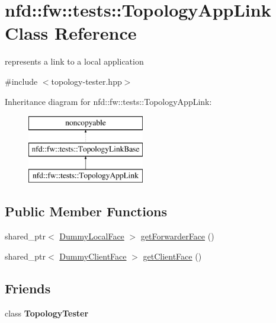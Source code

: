 \hypertarget{classnfd_1_1fw_1_1tests_1_1TopologyAppLink}{}\section{nfd\+:\+:fw\+:\+:tests\+:\+:Topology\+App\+Link Class Reference}
\label{classnfd_1_1fw_1_1tests_1_1TopologyAppLink}


represents a link to a local application  




{\ttfamily \#include $<$topology-\/tester.\+hpp$>$}

Inheritance diagram for nfd\+:\+:fw\+:\+:tests\+:\+:Topology\+App\+Link\+:\begin{figure}[H]
\begin{center}
\leavevmode
\includegraphics[height=3.000000cm]{classnfd_1_1fw_1_1tests_1_1TopologyAppLink}
\end{center}
\end{figure}
\subsection*{Public Member Functions}
\begin{DoxyCompactItemize}
\item 
shared\+\_\+ptr$<$ \hyperlink{classnfd_1_1tests_1_1DummyFaceImpl}{Dummy\+Local\+Face} $>$ \hyperlink{classnfd_1_1fw_1_1tests_1_1TopologyAppLink_adbb95be7ccb481d4b81a65248230d66f}{get\+Forwarder\+Face} ()
\item 
shared\+\_\+ptr$<$ \hyperlink{classndn_1_1util_1_1DummyClientFace}{Dummy\+Client\+Face} $>$ \hyperlink{classnfd_1_1fw_1_1tests_1_1TopologyAppLink_a0fcd76c7f1843da4cd470326d94fe1e6}{get\+Client\+Face} ()
\end{DoxyCompactItemize}
\subsection*{Friends}
\begin{DoxyCompactItemize}
\item 
class {\bfseries Topology\+Tester}\hypertarget{classnfd_1_1fw_1_1tests_1_1TopologyAppLink_ad2957f68ed7b1bdd9221b01579c80d94}{}\label{classnfd_1_1fw_1_1tests_1_1TopologyAppLink_ad2957f68ed7b1bdd9221b01579c80d94}

\end{DoxyCompactItemize}
